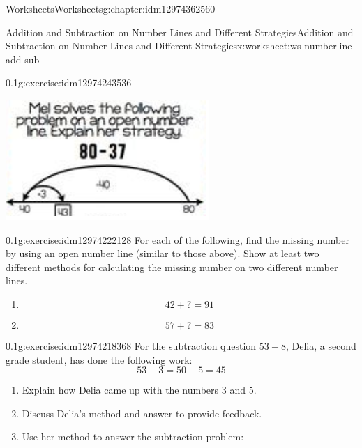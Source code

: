 \documentclass[twoside,11pt,]{book}
\begin{document}
\begin{chapterptx}{Worksheets}{}{Worksheets}{}{}{g:chapter:idm12974362560}
\begin{worksheet-section-numberless}{Addition and Subtraction on Number Lines and Different Strategies}{}{Addition and Subtraction on Number Lines and Different Strategies}{}{}{x:worksheet:ws-numberline-add-sub}
\begin{divisionexercise}{1}{}{0.1}{g:exercise:idm12974243536}
\begin{enumerate}[label=(\alph*)]
\begin{image}{0}{1}{0}
\includegraphics[width=1\linewidth]{images/numberline-add-sub-1b.png}
\end{image}%
\end{enumerate}
\end{divisionexercise}%
\begin{divisionexercise}{2}{}{0.1}{g:exercise:idm12974222128}%
For each of the following, find the missing number by using an open number line (similar to those above).  Show at least two different methods for calculating the missing number on two different number lines.%
%
\begin{enumerate}[label=(\alph*)]
\item{}%
\begin{equation*}
42+?=91 
\end{equation*}
%
\item{}%
\begin{equation*}
57+?=83 
\end{equation*}
%
\end{enumerate}
\end{divisionexercise}%
\begin{divisionexercise}{3}{}{0.1}{g:exercise:idm12974218368}%
For the subtraction question \(53-8\), Delia, a second grade student, has done the following work:%
\begin{equation*}
53- 3=50-5=45
\end{equation*}
%
%
\begin{enumerate}[label=(\alph*)]
\item{}Explain how Delia came up with the numbers 3 and 5.%
\item{}Discuss Delia's method and answer to provide feedback.%
\item{}Use her method to answer the subtraction problem:%
\begin{equation*}

\end{equation*}
\end{enumerate}
\end{divisionexercise}
\end{worksheet-section-numberless}
\end{chapterptx}
\end{document}
